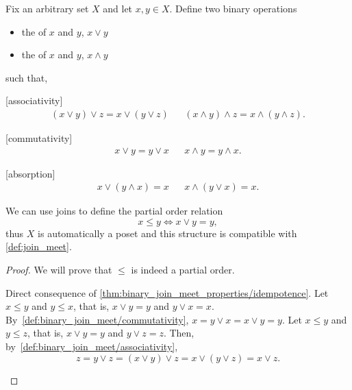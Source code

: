 \begin{definition}\label{def:binary_join_meet}
  Fix an arbitrary set \( X \) and let \( x, y \in X \). Define two binary operations
  \begin{itemize}
    \item the  of \( x \) and \( y \), \( x \lor y \)
    \item the  of \( x \) and \( y \), \( x \land y \)
  \end{itemize}
  such that,
  \begin{description}
    [associativity]
    \begin{align*}
      (x \lor y) \lor z = x \lor (y \lor z)
      &&
      (x \land y) \land z = x \land (y \land z).
    \end{align*}

    [commutativity]
    \begin{align*}
      x \lor y = y \lor x
      &&
      x \land y = y \land x.
    \end{align*}

    [absorption]
    \begin{align*}
      x \lor (y \land x) = x
      &&
      x \land (y \lor x) = x.
    \end{align*}
  \end{description}

  We can use joins to define the partial order relation
  \begin{equation*}
    x \leq y \iff x \lor y = y,
  \end{equation*}
  thus \( X \) is automatically a poset and this structure is compatible with \cref{def:join_meet}.
\end{definition}
\begin{proof}
  We will prove that \( \leq \) is indeed a partial order.
  \begin{description}
     Direct consequence of \cref{thm:binary_join_meet_properties/idempotence}.
     Let \( x \leq y \) and \( y \leq x \), that is, \( x \lor y = y \) and \( y \lor x = x \). By~\ref{def:binary_join_meet/commutativity}, \( x = y \lor x = x \lor y = y \).
     Let \( x \leq y \) and \( y \leq z \), that is, \( x \lor y = y \) and \( y \lor z = z \). Then, by~\ref{def:binary_join_meet/associativity},
    \begin{equation*}
      z = y \lor z = (x \lor y) \lor z = x \lor (y \lor z) = x \lor z.
    \end{equation*}
  \end{description}
\end{proof}

